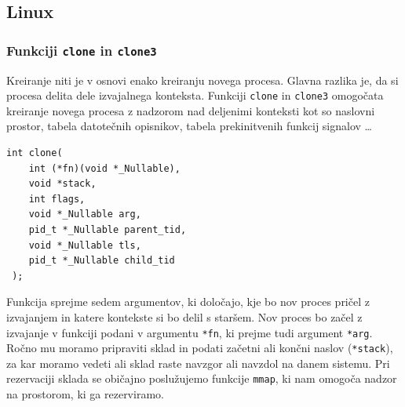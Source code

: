 \documentclass[a4paper,12pt,openright]{book}
\begin{document}
\subsection{Linux} \label{ssec:linux_syscalls:threads}

\subsubsection{Funkciji \texttt{clone} in \texttt{clone3}}

Kreiranje niti je v osnovi enako kreiranju novega procesa.
Glavna razlika je, da si procesa delita dele izvajalnega konteksta.
Funkciji \texttt{clone} in \texttt{clone3} omogočata kreiranje novega procesa z nadzorom nad deljenimi konteksti kot so naslovni prostor, tabela datotečnih opisnikov, tabela prekinitvenih funkcij signalov \dots

\begin{lstlisting}[style=func]
 int clone(
	int (*fn)(void *_Nullable),
	void *stack,
	int flags,
	void *_Nullable arg,
	pid_t *_Nullable parent_tid,
	void *_Nullable tls,
	pid_t *_Nullable child_tid
 );
\end{lstlisting}

Funkcija sprejme sedem argumentov, ki določajo, kje bo nov proces pričel z izvajanjem in katere kontekste si bo delil s staršem.
Nov proces bo začel z izvajanje v funkciji podani v argumentu \texttt{*fn}, ki prejme tudi argument \texttt{*arg}.
Ročno mu moramo pripraviti sklad in podati začetni ali končni naslov (\texttt{*stack}), za kar moramo vedeti ali sklad raste navzgor ali navzdol na danem sistemu.
Pri rezervaciji sklada se običajno poslužujemo funkcije \texttt{mmap}, ki nam omogoča nadzor na prostorom, ki ga rezerviramo.
\end{document}
